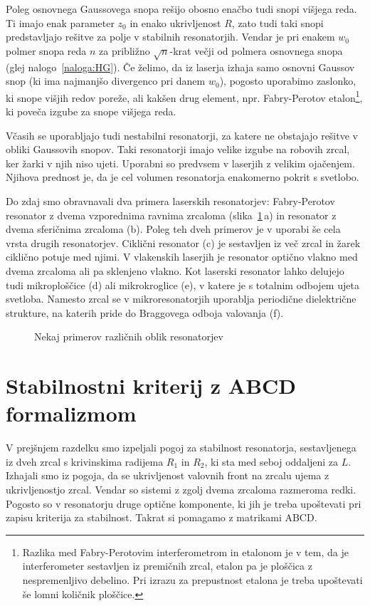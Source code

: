 Poleg osnovnega Gaussovega snopa rešijo obosno enačbo tudi snopi višjega reda. 
Ti imajo enak parameter $z_{0}$ in enako ukrivljenost $R$, zato tudi taki snopi 
predstavljajo rešitve za polje v stabilnih resonatorjih. Vendar je pri enakem $w_{0}$
polmer snopa reda $n$ za približno $\sqrt{n}$-krat večji od polmera osnovnega snopa
(glej nalogo~\ref{naloga:HG}). Če želimo, da iz laserja izhaja samo 
osnovni Gaussov snop (ki ima najmanjšo divergenco pri danem $w_0$), 
pogosto uporabimo zaslonko, ki snope višjih redov poreže, 
ali kakšen drug element, npr. Fabry-Perotov etalon\footnote{Razlika med Fabry-Perotovim
interferometrom in etalonom je v tem, da je interferometer sestavljen iz premičnih 
zrcal, etalon pa je ploščica z nespremenljivo debelino. Pri izrazu za prepustnost etalona
je treba upoštevati še lomni količnik ploščice.}, ki poveča izgube za snope višjega reda.
 
\begin{remark}
Včasih se uporabljajo tudi nestabilni resonatorji, za 
katere ne obstajajo rešitve v obliki Gaussovih snopov. Taki resonatorji 
imajo velike izgube na robovih zrcal, ker žarki v njih niso ujeti. 
Uporabni so predvsem v laserjih z velikim ojačenjem. Njihova prednost je, da je cel
volumen resonatorja enakomerno pokrit s svetlobo.
\end{remark}

Do zdaj smo obravnavali dva primera laserskih resonatorjev: Fabry-Perotov
resonator z dvema vzporednima ravnima zrcaloma (slika~\ref{fig:resonatorji}\,a) 
in resonator z dvema sferičnima zrcaloma (b).
Poleg teh dveh primerov je v uporabi še cela vrsta drugih resonatorjev. Ciklični
resonator (c) je
sestavljen iz več zrcal in žarek ciklično potuje med njimi. V vlakenskih laserjih je resonator
optično vlakno med dvema zrcaloma ali pa sklenjeno vlakno. 
Kot laserski resonator lahko delujejo tudi mikroploščice (d) ali mikrokroglice (e), 
v katere je s totalnim odbojem ujeta svetloba. 
Namesto zrcal se v mikroresonatorjih uporablja periodične dielektrične strukture, na katerih 
pride do Braggovega odboja valovanja (f).
\begin{figure}[h]
\centering
\def\svgwidth{140truemm} 

\caption{Nekaj primerov različnih oblik resonatorjev}
\label{fig:resonatorji}
\end{figure}

\section{Stabilnostni kriterij z ABCD formalizmom}
V prejšnjem razdelku smo izpeljali pogoj za stabilnost resonatorja, 
sestavljenega iz dveh zrcal s krivinskima radijema $R_1$ in $R_2$, ki sta med 
seboj oddaljeni za $L$. Izhajali smo iz pogoja, da se ukrivljenost
valovnih front na zrcalu ujema z ukrivljenostjo zrcal. Vendar so sistemi z
zgolj dvema zrcaloma razmeroma redki. Pogosto so v resonatorju
druge optične komponente, ki jih je treba upoštevati pri zapisu
kriterija za stabilnost. Takrat si pomagamo z matrikami ABCD. 

